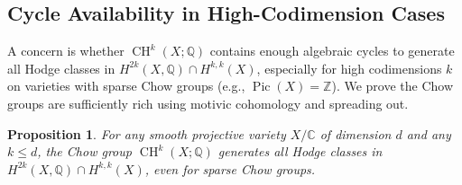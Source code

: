 \documentclass[11pt]{article}
\newtheorem{proposition}[theorem]{Proposition}
\DeclareMathOperator{\CH}{CH}
\DeclareMathOperator{\Pic}{Pic}
\begin{document}
\subsection{Cycle Availability in High-Codimension Cases}\label{subsec:cycle-availability-addendum}
A concern is whether \(\CH^k(X; \mathbb{Q})\) contains enough algebraic cycles to generate all Hodge classes in \(H^{2k}(X, \mathbb{Q}) \cap H^{k,k}(X)\), especially for high codimensions \(k\) on varieties with sparse Chow groups (e.g., \(\Pic(X) = \mathbb{Z}\)). We prove the Chow groups are sufficiently rich using motivic cohomology and spreading out.
\begin{proposition}\label{prop:cycle-availability}
For any smooth projective variety \(X/\mathbb{C}\) of dimension \(d\) and any \(k \leq d\), the Chow group \(\CH^k(X; \mathbb{Q})\) generates all Hodge classes in \(H^{2k}(X, \mathbb{Q}) \cap H^{k,k}(X)\), even for sparse Chow groups.
\end{proposition}
\end{document}
